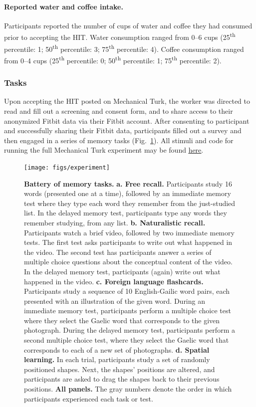 \documentclass[10pt]{article}
\begin{document}
\paragraph{Reported water and coffee intake.}
Participants reported the number of cups of water and coffee they had
consumed prior to accepting the HIT.  Water consumption ranged from
0--6 cups (25\textsuperscript{th} percentile: 1;
50\textsuperscript{th} percentile: 3; 75\textsuperscript{th}
percentile: 4).  Coffee consumption ranged from 0--4 cups (25\textsuperscript{th} percentile: 0;
50\textsuperscript{th} percentile: 1; 75\textsuperscript{th}
percentile: 2).


\subsubsection*{Tasks}
Upon accepting the HIT posted on Mechanical Turk, the worker was
directed to read and fill out a screening and consent form, and to
share access to their anonymized Fitbit data via their Fitbit account.
After consenting to participant and successfully sharing their Fitbit
data, participants filled out a survey and then engaged in a series of
memory tasks (Fig.~\ref{fig:tasks}).  All stimuli and code for running
the full Mechanical Turk experiment may be found
\href{https://github.com/ContextLab/brainfit-task}{\underline{here}}.

\begin{figure}[tp]
\centering
\texttt{[image: figs/experiment]}
\caption{\textbf{Battery of memory tasks.}  \textbf{a.  Free recall.}
Participants study 16 words (presented one at a time), followed by an
immediate memory test where they type
each word they remember from the just-studied list.  In the delayed
memory test, participants type any words they remember studying, from
any list.  \textbf{b. Naturalistic recall.}  Participants watch a
brief video, followed by two immediate memory tests.  The first test
asks participants to write out what happened in the video.  The second
test has participants answer a series of multiple choice questions
about the conceptual content of the video.  In the delayed memory
test, participants (again) write out what happened in the video.
\textbf{c. Foreign language flashcards.}  Participants study a
sequence of 10 English-Gailic word pairs, each presented with an
illustration of the given word.  During an immediate memory test,
participants perform a multiple choice test where they select the
Gaelic word that corresponds to the given photograph.  During the
delayed memory test, participants perform a second multiple choice
test, where they select the Gaelic word that corresponds to each of a
new set of photographs.  \textbf{d. Spatial learning.}  In each trial,
participants
study a set of randomly positioned shapes.  Next, the shapes'
positions are altered, and participants are asked to drag the shapes
back to their previous positions.  \textbf{All panels.}  The gray
numbers denote the order in which participants experienced each task
or test.}
\label{fig:tasks}
\end{figure}
\end{document}
